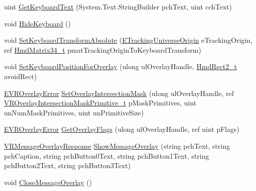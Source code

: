 \begin{DoxyCompactItemize}
\item 
uint \mbox{\hyperlink{class_valve_1_1_v_r_1_1_c_v_r_overlay_a7615afd64ce4f563313b3db7284d0d54}{Get\+Keyboard\+Text}} (System.\+Text.\+String\+Builder pch\+Text, uint cch\+Text)
\item 
void \mbox{\hyperlink{class_valve_1_1_v_r_1_1_c_v_r_overlay_a2fa3d6db14e52d72267aebc1fec6de27}{Hide\+Keyboard}} ()
\item 
void \mbox{\hyperlink{class_valve_1_1_v_r_1_1_c_v_r_overlay_af389a27b7be568bcfac9d0682a57f47d}{Set\+Keyboard\+Transform\+Absolute}} (\mbox{\hyperlink{namespace_valve_1_1_v_r_a29be99a3c2f780157bd490db06a7f12f}{E\+Tracking\+Universe\+Origin}} e\+Tracking\+Origin, ref \mbox{\hyperlink{struct_valve_1_1_v_r_1_1_hmd_matrix34__t}{Hmd\+Matrix34\+\_\+t}} pmat\+Tracking\+Origin\+To\+Keyboard\+Transform)
\item 
void \mbox{\hyperlink{class_valve_1_1_v_r_1_1_c_v_r_overlay_afaf593636880c06d2965a59ae839e3d8}{Set\+Keyboard\+Position\+For\+Overlay}} (ulong ul\+Overlay\+Handle, \mbox{\hyperlink{struct_valve_1_1_v_r_1_1_hmd_rect2__t}{Hmd\+Rect2\+\_\+t}} avoid\+Rect)
\item 
\mbox{\hyperlink{namespace_valve_1_1_v_r_aaee5c5144f42b7969d45b854f51b0c18}{E\+V\+R\+Overlay\+Error}} \mbox{\hyperlink{class_valve_1_1_v_r_1_1_c_v_r_overlay_ad46d3895589f3577b462e07df50713a4}{Set\+Overlay\+Intersection\+Mask}} (ulong ul\+Overlay\+Handle, ref \mbox{\hyperlink{struct_valve_1_1_v_r_1_1_v_r_overlay_intersection_mask_primitive__t}{V\+R\+Overlay\+Intersection\+Mask\+Primitive\+\_\+t}} p\+Mask\+Primitives, uint un\+Num\+Mask\+Primitives, uint un\+Primitive\+Size)
\item 
\mbox{\hyperlink{namespace_valve_1_1_v_r_aaee5c5144f42b7969d45b854f51b0c18}{E\+V\+R\+Overlay\+Error}} \mbox{\hyperlink{class_valve_1_1_v_r_1_1_c_v_r_overlay_a53887eb449bfbd1548bb43b021f8a47e}{Get\+Overlay\+Flags}} (ulong ul\+Overlay\+Handle, ref uint p\+Flags)
\item 
\mbox{\hyperlink{namespace_valve_1_1_v_r_a034ef9b0267f2fa2e4a227bc2c73473f}{V\+R\+Message\+Overlay\+Response}} \mbox{\hyperlink{class_valve_1_1_v_r_1_1_c_v_r_overlay_a8a66ef45b00adbf6aa674ca2f8976f92}{Show\+Message\+Overlay}} (string pch\+Text, string pch\+Caption, string pch\+Button0\+Text, string pch\+Button1\+Text, string pch\+Button2\+Text, string pch\+Button3\+Text)
\item 
void \mbox{\hyperlink{class_valve_1_1_v_r_1_1_c_v_r_overlay_a2b2c9997673969df0565f26144132867}{Close\+Message\+Overlay}} ()
\end{DoxyCompactItemize}


